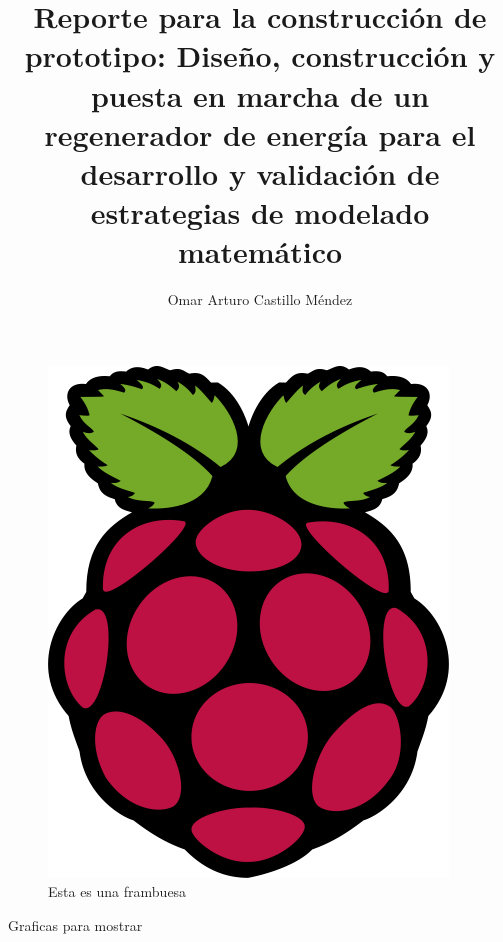 \documentclass[spanish,12pt,letterpaper,final]{article}
\title{Reporte para la construcción de prototipo: Diseño, construcción y puesta en marcha de un regenerador de energía para el desarrollo y validación de estrategias de modelado matemático}
\author{Omar Arturo Castillo Méndez}
\begin{document}
	
	\begin{figure}
		\centering
		\includegraphics[scale=0.5]{rpi.png}
		\caption{Esta es una frambuesa}
	\end{figure}
 Graficas para mostrar
\end{document}
